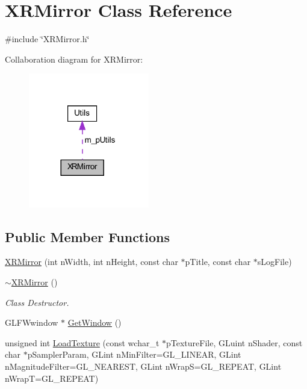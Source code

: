 \hypertarget{class_x_r_mirror}{}\section{X\+R\+Mirror Class Reference}
\label{class_x_r_mirror}


{\ttfamily \#include \char`\"{}X\+R\+Mirror.\+h\char`\"{}}



Collaboration diagram for X\+R\+Mirror\+:\nopagebreak
\begin{figure}[H]
\begin{center}
\leavevmode
\includegraphics[width=149pt]{class_x_r_mirror__coll__graph}
\end{center}
\end{figure}
\subsection*{Public Member Functions}
\begin{DoxyCompactItemize}
\item 
\mbox{\hyperlink{class_x_r_mirror_a8eef43790b56bb299df314080be53ad9}{X\+R\+Mirror}} (int n\+Width, int n\+Height, const char $\ast$p\+Title, const char $\ast$s\+Log\+File)
\item 
\mbox{\hyperlink{class_x_r_mirror_a2406d486889b31a1854d7d276a9e71f2}{$\sim$\+X\+R\+Mirror}} ()
\begin{DoxyCompactList}\small\item\em Class Destructor. \end{DoxyCompactList}\item 
G\+L\+F\+Wwindow $\ast$ \mbox{\hyperlink{class_x_r_mirror_a966faccfee88f1f4ca2b8cfc881658c0}{Get\+Window}} ()
\item 
unsigned int \mbox{\hyperlink{class_x_r_mirror_aee8cb008c3732293fb45ef056a4f1fc6}{Load\+Texture}} (const wchar\+\_\+t $\ast$p\+Texture\+File, G\+Luint n\+Shader, const char $\ast$p\+Sampler\+Param, G\+Lint n\+Min\+Filter=G\+L\+\_\+\+L\+I\+N\+E\+AR, G\+Lint n\+Magnitude\+Filter=G\+L\+\_\+\+N\+E\+A\+R\+E\+ST, G\+Lint n\+WrapS=G\+L\+\_\+\+R\+E\+P\+E\+AT, G\+Lint n\+WrapT=G\+L\+\_\+\+R\+E\+P\+E\+AT)
\end{DoxyCompactItemize}
